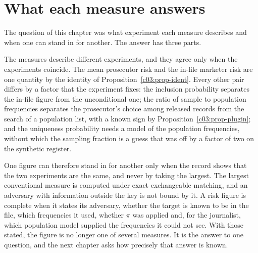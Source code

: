 \section{What each measure answers}

The question of this chapter was what experiment each measure describes and when one
can stand in for another. The answer has three parts.

The measures describe different experiments, and they agree only when the experiments
coincide. The mean prosecutor risk and the in-file marketer risk are one quantity by the
identity of Proposition~\ref{c03:prop-ident}. Every other pair differs by a factor that
the experiment fixes: the inclusion probability separates the in-file figure from the
unconditional one; the ratio of sample to population frequencies separates the
prosecutor's choice among released records from the search of a population list, with a
known sign by Proposition~\ref{c03:prop-plugin}; and the uniqueness probability needs a
model of the population frequencies, without which the sampling fraction is a guess that
was off by a factor of two on the synthetic register.

One figure can therefore stand in for another only when the record shows that the two
experiments are the same, and never by taking the largest. The largest conventional
measure is computed under exact exchangeable matching, and an adversary with
information outside the key is not bound by it. A risk figure is complete when it
states its adversary, whether the target is known to be in the file, which frequencies
it used, whether $\pi$ was applied and, for the journalist, which population model
supplied the frequencies it could not see. With those stated, the figure is no longer
one of several measures. It is the answer to one question, and the next chapter asks
how precisely that answer is known.

